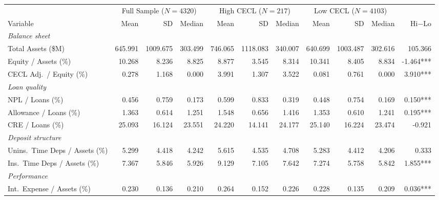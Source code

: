 \begingroup
\centering
\begin{tabular}{lrrr rrr rrr r}
  \tabularnewline \midrule \midrule
  & \multicolumn{3}{c}{Full Sample ($N=4320$)} & \multicolumn{3}{c}{High CECL ($N=217$)} & \multicolumn{3}{c}{Low CECL ($N=4103$)} & \\
  \cmidrule(lr){2-4}\cmidrule(lr){5-7}\cmidrule(lr){8-10}
  Variable & Mean & SD & Median & Mean & SD & Median & Mean & SD & Median & Hi$-$Lo \\
  \midrule
  \emph{Balance sheet} & & & & & & & & & & \\
  \hspace{1em}Total Assets (\$M) & 645.991 & 1009.675 & 303.499 & 746.065 & 1118.083 & 340.007 & 640.699 & 1003.487 & 302.616 & 105.366 \\
  \hspace{1em}Equity / Assets (\%) & 10.268 & 8.236 & 8.825 & 8.877 & 3.545 & 8.314 & 10.341 & 8.405 & 8.834 & -1.464*** \\
  \hspace{1em}CECL Adj.\ / Equity (\%) & 0.278 & 1.168 & 0.000 & 3.991 & 1.307 & 3.522 & 0.081 & 0.761 & 0.000 & 3.910*** \\
  \midrule
  \emph{Loan quality} & & & & & & & & & & \\
  \hspace{1em}NPL / Loans (\%) & 0.456 & 0.759 & 0.173 & 0.599 & 0.833 & 0.319 & 0.448 & 0.754 & 0.169 & 0.150*** \\
  \hspace{1em}Allowance / Loans (\%) & 1.363 & 0.614 & 1.251 & 1.548 & 0.656 & 1.416 & 1.353 & 0.610 & 1.241 & 0.195*** \\
  \hspace{1em}CRE / Loans (\%) & 25.093 & 16.124 & 23.551 & 24.220 & 14.141 & 24.177 & 25.140 & 16.224 & 23.474 & -0.921 \\
  \midrule
  \emph{Deposit structure} & & & & & & & & & & \\
  \hspace{1em}Unins.\ Time Deps / Assets (\%) & 5.299 & 4.418 & 4.242 & 5.615 & 4.535 & 4.708 & 5.283 & 4.412 & 4.206 & 0.333 \\
  \hspace{1em}Ins.\ Time Deps / Assets (\%) & 7.367 & 5.846 & 5.926 & 9.129 & 7.105 & 7.642 & 7.274 & 5.758 & 5.842 & 1.855*** \\
  \midrule
  \emph{Performance} & & & & & & & & & & \\
  \hspace{1em}Int.\ Expense / Assets (\%) & 0.230 & 0.136 & 0.210 & 0.264 & 0.152 & 0.226 & 0.228 & 0.135 & 0.209 & 0.036*** \\

\end{tabular}
